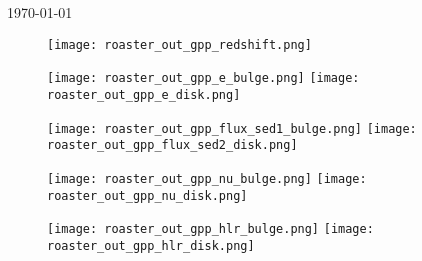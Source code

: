 \documentclass{article}
\begin{document}
\today

\begin{figure}[hb]
	\centerline{
		\texttt{[image: roaster\_out\_gpp\_redshift.png]}
	}
	\centerline{
		\texttt{[image: roaster\_out\_gpp\_e\_bulge.png]}
		\texttt{[image: roaster\_out\_gpp\_e\_disk.png]}
	}
	\centerline{
		\texttt{[image: roaster\_out\_gpp\_flux\_sed1\_bulge.png]}
		\texttt{[image: roaster\_out\_gpp\_flux\_sed2\_disk.png]}
	}
	\centerline{
		\texttt{[image: roaster\_out\_gpp\_nu\_bulge.png]}
		\texttt{[image: roaster\_out\_gpp\_nu\_disk.png]}
	}
	\centerline{
		\texttt{[image: roaster\_out\_gpp\_hlr\_bulge.png]}
		\texttt{[image: roaster\_out\_gpp\_hlr\_disk.png]}
	}	
\end{figure}
\end{document}

